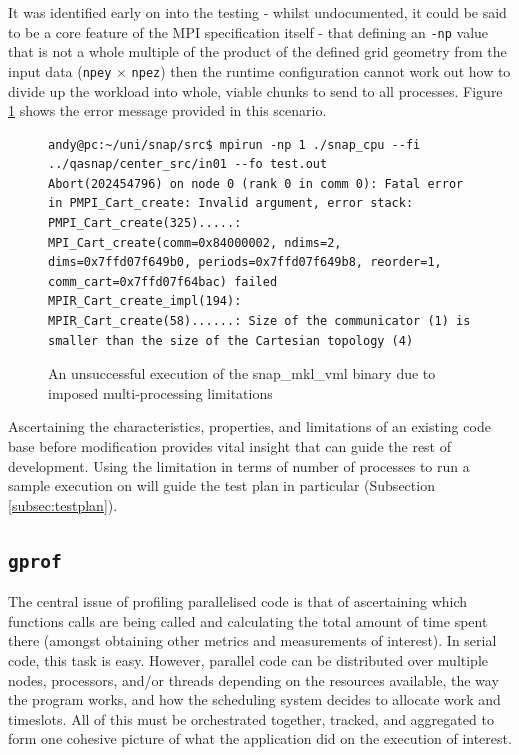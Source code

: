 \documentclass[conference]{IEEEtran}
\begin{document}
It was identified early on into the testing - whilst undocumented, it could be said to be a core feature of the MPI specification itself - that defining an \texttt{-np} value that is not a whole multiple of the product of the defined grid geometry from the input data (\texttt{npey} $ \times $ \texttt{npez}) then the runtime configuration cannot work out how to divide up the workload into whole, viable chunks to send to all processes. Figure \ref{fig:snap-unsuccessful-run} shows the error message provided in this scenario.

\begin{figure}[h]
    \centering
    \begin{lstlisting}[breaklines]
andy@pc:~/uni/snap/src$ mpirun -np 1 ./snap_cpu --fi ../qasnap/center_src/in01 --fo test.out
Abort(202454796) on node 0 (rank 0 in comm 0): Fatal error in PMPI_Cart_create: Invalid argument, error stack:
PMPI_Cart_create(325).....: MPI_Cart_create(comm=0x84000002, ndims=2, dims=0x7ffd07f649b0, periods=0x7ffd07f649b8, reorder=1, comm_cart=0x7ffd07f64bac) failed
MPIR_Cart_create_impl(194): 
MPIR_Cart_create(58)......: Size of the communicator (1) is smaller than the size of the Cartesian topology (4)
    \end{lstlisting}
    \caption{An unsuccessful execution of the snap\_mkl\_vml binary due to imposed multi-processing limitations}
    \label{fig:snap-unsuccessful-run}
\end{figure}

Ascertaining the characteristics, properties, and limitations of an existing code base before modification provides vital insight that can guide the rest of development. Using the limitation in terms of number of processes to run a sample execution on will guide the test plan in particular (Subsection \ref{subsec:testplan}).


\subsection{\texttt{gprof}}

The central issue of profiling parallelised code is that of ascertaining which functions calls are being called and calculating the total amount of time spent there (amongst obtaining other metrics and measurements of interest). In serial code, this task is easy. However, parallel code can be distributed over multiple nodes, processors, and/or threads depending on the resources available, the way the program works, and how the scheduling system decides to allocate work and timeslots. All of this must be orchestrated together, tracked, and aggregated to form one cohesive picture of what the application did on the execution of interest.
\end{document}

